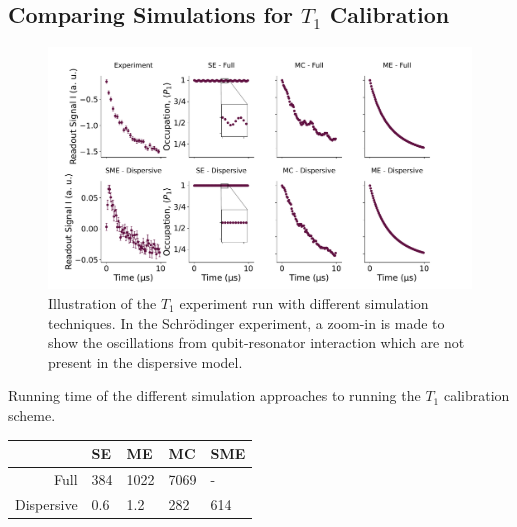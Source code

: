 \subsection{Comparing Simulations for $T_1$ Calibration}
\begin{figure}[t]
    \centering
    \includegraphics[]{Simulations/simulations_of_calibrations/Figs/qubit_T1_dispersive.pdf}
    \caption{Illustration of the $T_1$ experiment run with different simulation techniques. In the Schrödinger experiment, a zoom-in is made to show the oscillations from qubit-resonator interaction which are not present in the dispersive model. }
    \label{fig:calibrations_in_simulation}
\end{figure}
\begin{margintable}[2 cm]
    \caption{Running time of the different simulation approaches to running the $T_1$ calibration scheme.}
    \vspace{0.3 cm}
    \centering
    \begin{tabular}{r|llll}
                    &  SE   & ME    & MC    & SME   \\ \hline 
    Full            & 384   & 1022  & 7069  & -     \\
    Dispersive      & 0.6   & 1.2   & 282     & 614     \\ 
    \end{tabular}
    \label{tab:simulation_t1_running_time}
\end{margintable}
